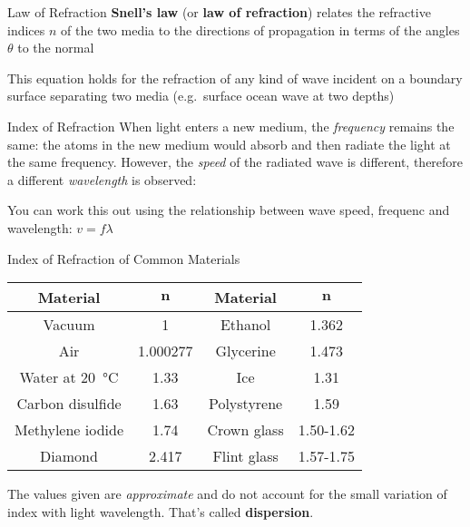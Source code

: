 \documentclass[12pt,compress,aspectratio=169]{beamer}
\begin{document}
\begin{frame}{Law of Refraction}
  \textbf{Snell's law} (or \textbf{law of refraction}) relates the refractive
  indices $n$ of the two media to the directions of propagation in terms of the
  angles $\theta$ to the normal


  This equation holds for the refraction of any kind of wave incident on a
  boundary surface separating two media (e.g.\ surface ocean wave at two
  depths)
\end{frame}



%    



\begin{frame}{Index of Refraction}
  When light enters a new medium, the \emph{frequency} remains the same: the
  atoms in the new medium would absorb and then radiate the light at the same
  frequency. However, the \emph{speed} of the radiated wave is different,
  therefore a different \emph{wavelength} is observed:
    

  You can work this out using the relationship between wave speed, frequenc
  and wavelength: $v=f\lambda$
\end{frame}



\begin{frame}{Index of Refraction of Common Materials}
  \begin{center}
    \begin{tabular}{c|c||c|c}
      \rowcolor{pink}
      \textbf{Material} & $\bm{n}$ & \textbf{Material} & $\bm{n}$\\ \hline
      Vacuum           & 1        & Ethanol     & 1.362 \\
      Air              & 1.000277 & Glycerine   & 1.473 \\
      Water at \SI{20}{\celsius} & 1.33 & Ice         & 1.31 \\
      Carbon disulfide & 1.63     & Polystyrene & 1.59 \\
      Methylene iodide & 1.74     & Crown glass & 1.50-1.62\\
      Diamond          & 2.417    & Flint glass & 1.57-1.75\\
    \end{tabular}
  \end{center}
  The values given are \emph{approximate} and do not account for the small
  variation of index with light wavelength. That's called \textbf{dispersion}.
\end{frame}
\end{document}
